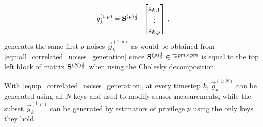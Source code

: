 \documentclass[conference]{IEEEtran}
\theoremstyle{definition}
\theoremstyle{remark}
\begin{document}
\begin{equation}\label{eqn:p_correlated_noises_generation}
  \vec{g}_k^{(1:p)}=
  \mat{S}^{(p)\frac{1}{2}}\cdot
  \begin{bmatrix}
    \vec{z}_{k,1}\\
    \vdots\\
    \vec{z}_{k,p}
  \end{bmatrix}\,,
\end{equation}
generates the same first $p$ noises $\vec{g}_k^{(1:p)}$ as would be obtained from \eqref{eqn:all_correlated_noises_generation} since ${{\mathbf{S}}}^{(p)\frac{1}{2}}\in\mathbb{R}^{pm\times pm}$ is equal to the top left block of matrix ${{\mathbf{S}}}^{(N)\frac{1}{2}}$ when using the Cholesky decomposition.

With \eqref{eqn:p_correlated_noises_generation}, at every timestep $k$, $\vec{g}_k^{(1:N)}$ can be generated using all $N$ keys and used to modify sensor measurements, while the subset $\vec{g}_k^{(1:p)}$ can be generated by estimators of privilege $p$ using the only keys they hold.

% 
% 
\end{document}
